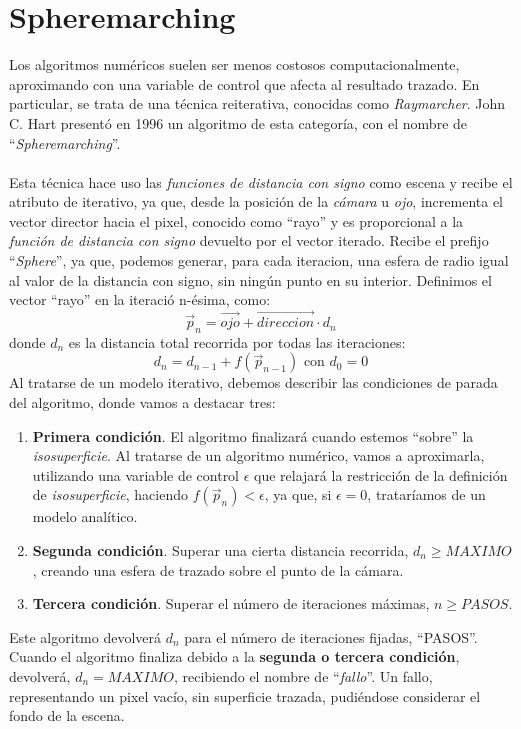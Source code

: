 \section{Spheremarching\label{sec:spheremarching}}
Los algoritmos numéricos suelen ser menos costosos computacionalmente, aproximando con una variable de control que afecta al resultado trazado. En particular, se trata de una técnica reiterativa, conocidas como \textit{Raymarcher}. John C. Hart presentó en 1996 un algoritmo de esta categoría, con el nombre de  \enquote{\textit{Spheremarching}}\cite{hart1996sphere}.\\\\
Esta técnica hace uso las \textit{funciones de distancia con signo} como escena y recibe el atributo de iterativo, ya que, desde la posición de la \textit{cámara} u \textit{ojo}, incrementa el vector director hacia el pixel, conocido como \enquote{rayo} y es proporcional a la \textit{función de distancia con signo} devuelto por el vector iterado. Recibe el prefijo \enquote{\textit{Sphere}\textendash}, ya que, podemos generar, para cada iteracion, una esfera de radio igual al valor de la distancia con signo, sin ningún punto en su interior. Definimos el vector \enquote{rayo} en la iteració n-ésima, como:
\[ \Vec{p}_{n}=\Vec{ojo} + \Vec{direccion} \cdot d_{n} \]
donde \(d_{n}\) es la distancia total recorrida por todas las iteraciones:
\[d_{n}=d_{n-1} + f(\Vec{p}_{n-1})\text{ con } d_0=0\]
Al tratarse de un modelo iterativo, debemos describir las condiciones de parada del algoritmo, donde vamos a destacar tres:
\begin{enumerate}
    \item \textbf{Primera condición}. El algoritmo finalizará cuando estemos \enquote{sobre} la \textit{isosuperficie}. Al tratarse de un algoritmo numérico, vamos a aproximarla, utilizando una variable de control \(\epsilon\) que relajará la restricción de la definición de  \textit{isosuperficie}, haciendo \(f(\Vec{p}_n) < \epsilon\), ya que, si \(\epsilon = 0\), trataríamos de un modelo analítico.
    \item \textbf{Segunda condición}. Superar una cierta distancia recorrida, \(d_{n}\ge MAXIMO\), creando una esfera de trazado sobre el punto de la cámara.
    \item \textbf{Tercera condición}. Superar el número de iteraciones máximas, \(n \ge PASOS\).
\end{enumerate}
Este algoritmo devolverá \(d_n\) para el número de iteraciones fijadas, \enquote{PASOS}. Cuando el algoritmo finaliza debido a la \textbf{segunda o tercera condición}, devolverá, \(d_n=MAXIMO\), recibiendo el nombre de \enquote{\textit{fallo}}. Un fallo, representando un pixel vacío, sin superficie trazada, pudiéndose considerar el fondo de la escena.
